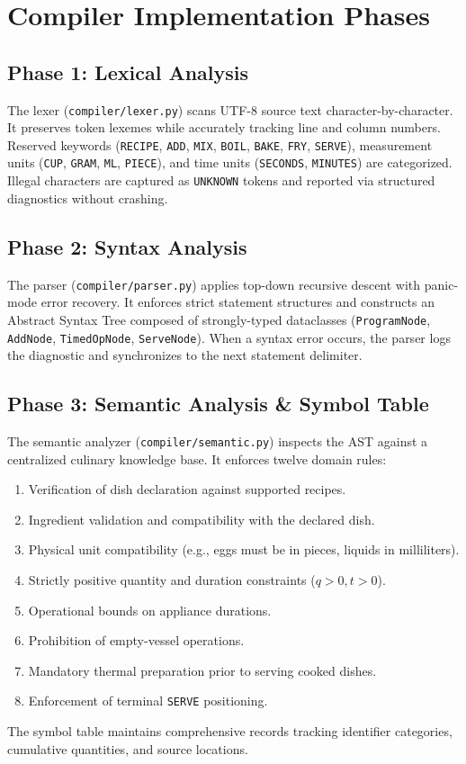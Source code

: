 \documentclass[conference]{IEEEtran}
\begin{document}
\section{Compiler Implementation Phases}

\subsection{Phase 1: Lexical Analysis}
The lexer (\texttt{compiler/lexer.py}) scans UTF-8 source text character-by-character. It preserves token lexemes while accurately tracking line and column numbers. Reserved keywords (\texttt{RECIPE}, \texttt{ADD}, \texttt{MIX}, \texttt{BOIL}, \texttt{BAKE}, \texttt{FRY}, \texttt{SERVE}), measurement units (\texttt{CUP}, \texttt{GRAM}, \texttt{ML}, \texttt{PIECE}), and time units (\texttt{SECONDS}, \texttt{MINUTES}) are categorized. Illegal characters are captured as \texttt{UNKNOWN} tokens and reported via structured diagnostics without crashing.

\subsection{Phase 2: Syntax Analysis}
The parser (\texttt{compiler/parser.py}) applies top-down recursive descent with panic-mode error recovery. It enforces strict statement structures and constructs an Abstract Syntax Tree composed of strongly-typed dataclasses (\texttt{ProgramNode}, \texttt{AddNode}, \texttt{TimedOpNode}, \texttt{ServeNode}). When a syntax error occurs, the parser logs the diagnostic and synchronizes to the next statement delimiter.

\subsection{Phase 3: Semantic Analysis \& Symbol Table}
The semantic analyzer (\texttt{compiler/semantic.py}) inspects the AST against a centralized culinary knowledge base. It enforces twelve domain rules:
\begin{enumerate}
    \item Verification of dish declaration against supported recipes.
    \item Ingredient validation and compatibility with the declared dish.
    \item Physical unit compatibility (e.g., eggs must be in pieces, liquids in milliliters).
    \item Strictly positive quantity and duration constraints ($q > 0, t > 0$).
    \item Operational bounds on appliance durations.
    \item Prohibition of empty-vessel operations.
    \item Mandatory thermal preparation prior to serving cooked dishes.
    \item Enforcement of terminal \texttt{SERVE} positioning.
\end{enumerate}
The symbol table maintains comprehensive records tracking identifier categories, cumulative quantities, and source locations.
\end{document}
